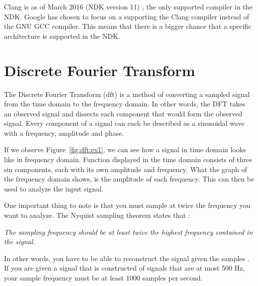 Clang is as of March 2016 (NDK version 11) \cite{android:ndk:revision}, the only supported compiler in the NDK. Google has chosen to focus on a supporting the Clang compiler instead of the GNU GCC compiler. This means that there is a bigger chance that a specific architecture is supported in the NDK.


\section{Discrete Fourier Transform}
The Discrete Fourier Transform (\gls{dft}) is a method of converting a sampled signal from the time domain to the frequency domain. In other words, the DFT takes an observed signal and dissects each component that would form the observed signal. Every component of a signal can each be described as a sinusoidal wave with a frequency, amplitude and phase.

If we observe Figure~\ref{fig:dft:ex1}, we can see how a signal in time domain looks like in frequency domain. Function displayed in the time domain consists of three sin components, each with its own amplitude and frequency. What the graph of the frequency domain shows, is the amplitude of each frequency. This can then be used to analyze the input signal.

One important thing to note is that you must sample at twice the frequency you want to analyze. The Nyquist sampling theorem states that \cite{signal:aliasing}:
\begin{center}
    \textit{The sampling frequency should be at least twice the highest frequency contained in the signal.}
\end{center}
In other words, you have to be able to reconstruct the signal given the samples \cite[Ch~3]{smith1997scientist}. If you are given a signal that is constructed of signals that are at most 500 Hz, your sample frequency must be at least 1000 samples per second.

